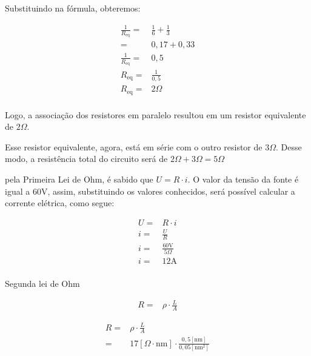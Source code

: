 Substituindo na fórmula, obteremos:

\begin{ceqn}
    \begin{align*}
        \frac{1}{R_{\text{eq}}} =& \frac{1}{6} + \frac{1}{3} \\
        =& 0,17+ 0,33 \\
        \frac{1}{R_{\text{eq}}} =& 0,5 \\
        R_{\text{eq}} =& \frac{1}{0,5} \\
        R_{\text{eq}} =& 2 \Omega \\
    \end{align*}
\end{ceqn}

Logo, a associação dos resistores em paralelo resultou em um resistor equivalente de $2 \Omega$. 

Esse resistor equivalente, agora, está em série com o outro resistor de $3 \Omega$. Desse modo, a resistência total do circuito será de $2 \Omega + 3 \Omega = 5 \Omega$

pela Primeira Lei de Ohm, é sabido que $U = R \cdot i$. O valor da tensão da fonte é igual a $60 \text{V}$, assim, substituindo os valores conhecidos, será possível calcular a corrente elétrica, como segue:


\begin{ceqn}
    \begin{align*}
        U =& R \cdot i \\
        i =& \frac{U}{R} \\
        i =& \frac{60 \text{V}}{5 \Omega} \\
        i =& 12 \text{A} \\
    \end{align*}
\end{ceqn}


Segunda lei de Ohm

\begin{ceqn}
    \begin{align*}
        R =& \rho \cdot \frac{L}{A}
    \end{align*}
\end{ceqn}



\begin{ceqn}
    \begin{align*}
        R =& \rho \cdot \frac{L}{A} \\
        =& 17 [\Omega \cdot \text{nm}] \cdot \frac{0,5 [\text{nm}]}{0,05 [\text{nm}^2]}
    \end{align*}
\end{ceqn}

